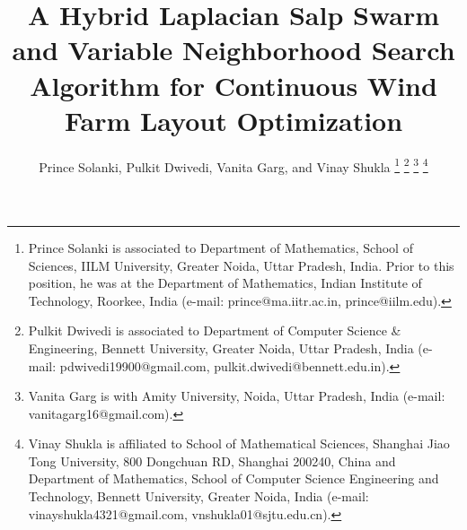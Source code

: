 \documentclass[journal,twoside]{IEEEtran}
\begin{document}
\title{A Hybrid Laplacian Salp Swarm and Variable Neighborhood Search Algorithm for Continuous Wind Farm Layout Optimization}
\author{Prince Solanki, Pulkit Dwivedi, Vanita Garg, and Vinay Shukla
\thanks{Prince Solanki is associated to Department of Mathematics, School of Sciences, IILM University, Greater Noida, Uttar Pradesh, India. Prior to this position, he was at the Department of Mathematics, Indian Institute of Technology, Roorkee, India (e-mail: prince@ma.iitr.ac.in, prince@iilm.edu). }
\thanks{Pulkit Dwivedi is associated to Department of Computer Science \& Engineering, Bennett University, Greater Noida, Uttar Pradesh, India (e-mail: pdwivedi19900@gmail.com, pulkit.dwivedi@bennett.edu.in).}
\thanks{Vanita Garg is with Amity University, Noida, Uttar Pradesh, India (e-mail: vanitagarg16@gmail.com).}
\thanks{Vinay Shukla is affiliated to School of Mathematical Sciences,  Shanghai Jiao Tong University, 800 Dongchuan RD, Shanghai 200240, China and Department of Mathematics, School of Computer Science Engineering and Technology, Bennett University, Greater Noida, India (e-mail: vinayshukla4321@gmail.com, vnshukla01@sjtu.edu.cn).}}

\maketitle
\end{document}
